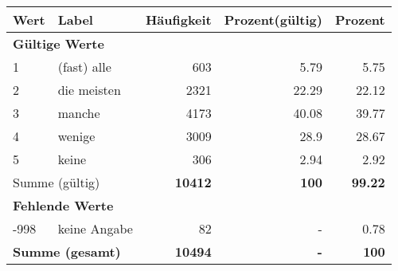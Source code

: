     \begin{longtable}{lXrrr}
     \toprule
     \textbf{Wert} & \textbf{Label} & \textbf{Häufigkeit} & \textbf{Prozent(gültig)} & \textbf{Prozent} \\
     \endhead
     \midrule
     \multicolumn{5}{l}{\textbf{Gültige Werte}}\\

     1 &
     \multicolumn{1}{X}{ (fast) alle   } &


       \num{603} &
       \num[round-mode=places,round-precision=2]{5.79} &
         \num[round-mode=places,round-precision=2]{5.75} \\

     2 &
     \multicolumn{1}{X}{ die meisten   } &


       \num{2321} &
       \num[round-mode=places,round-precision=2]{22.29} &
         \num[round-mode=places,round-precision=2]{22.12} \\

     3 &
     \multicolumn{1}{X}{ manche   } &


       \num{4173} &
       \num[round-mode=places,round-precision=2]{40.08} &
         \num[round-mode=places,round-precision=2]{39.77} \\

     4 &
     \multicolumn{1}{X}{ wenige   } &


       \num{3009} &
       \num[round-mode=places,round-precision=2]{28.9} &
         \num[round-mode=places,round-precision=2]{28.67} \\

     5 &
     \multicolumn{1}{X}{ keine   } &


       \num{306} &
       \num[round-mode=places,round-precision=2]{2.94} &
         \num[round-mode=places,round-precision=2]{2.92} \\
     \midrule
     \multicolumn{2}{l}{Summe (gültig)} &
       \textbf{\num{10412}} &
     \textbf{\num{100}} &
       \textbf{\num[round-mode=places,round-precision=2]{99.22}} \\
     \multicolumn{5}{l}{\textbf{Fehlende Werte}}\\
       -998 &
       keine Angabe &
         \num{82} &
        - &
         \num[round-mode=places,round-precision=2]{0.78} \\
     \midrule
     \multicolumn{2}{l}{\textbf{Summe (gesamt)}} &
          \textbf{\num{10494}} &
        \textbf{-} &
        \textbf{\num{100}} \\
     \bottomrule
     \end{longtable}
     
